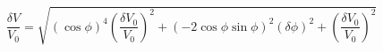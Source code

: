 \begin{equation}
\label{eq:delta_V_Malus}
\frac{\delta V}{V_0} = \sqrt{ {\left(\cos{\phi}\right)}^4\left(\frac{\delta V_0}{V_0}\right)^2 + \left(-2 \cos{\phi}\sin{\phi} \right)^2(\delta \phi)^2+ \left(\frac{\delta V_0}{V_0}\right)^2}
\end{equation}